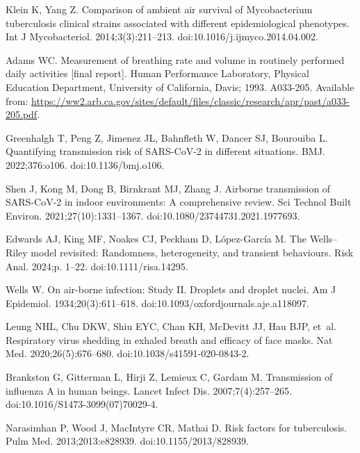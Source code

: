 \documentclass[fleqn,11pt]{wlscirep}
\begin{document}
\begin{thebibliography}{10}
Klein K, Yang Z.
\newblock Comparison of ambient air survival of {Mycobacterium} tuberculosis
  clinical strains associated with different epidemiological phenotypes.
\newblock Int J Mycobacteriol. 2014;3(3):211--213.
\newblock doi:10.1016/j.ijmyco.2014.04.002.

Adams WC.
\newblock Measurement of breathing rate and volume in routinely performed daily
  activities [final report].
\newblock Human Performance Laboratory, Physical Education Department,
  University of California, Davis; 1993. A033-205.
\newblock Available from:
  \url{https://ww2.arb.ca.gov/sites/default/files/classic/research/apr/past/a033-205.pdf}.

Greenhalgh T, Peng Z, Jimenez JL, Bahnfleth W, Dancer SJ, Bourouiba L.
\newblock Quantifying transmission risk of {SARS}-{CoV}-2 in different
  situations.
\newblock BMJ. 2022;376:o106.
\newblock doi:10.1136/bmj.o106.

Shen J, Kong M, Dong B, Birnkrant MJ, Zhang J.
\newblock Airborne transmission of {SARS}-{CoV}-2 in indoor environments: {A}
  comprehensive review.
\newblock Sci Technol Built Environ. 2021;27(10):1331--1367.
\newblock doi:10.1080/23744731.2021.1977693.

Edwards AJ, King MF, Noakes CJ, Peckham D, López-García M.
\newblock The {Wells}–{Riley} model revisited: {Randomness}, heterogeneity,
  and transient behaviours.
\newblock Risk Anal. 2024;p. 1--22.
\newblock doi:10.1111/risa.14295.

Wells W.
\newblock On air-borne infection: {Study} {II}. {Droplets} and droplet nuclei.
\newblock Am J Epidemiol. 1934;20(3):611--618.
\newblock doi:10.1093/oxfordjournals.aje.a118097.

Leung NHL, Chu DKW, Shiu EYC, Chan KH, McDevitt JJ, Hau BJP, et~al.
\newblock Respiratory virus shedding in exhaled breath and efficacy of face
  masks.
\newblock Nat Med. 2020;26(5):676--680.
\newblock doi:10.1038/s41591-020-0843-2.

Brankston G, Gitterman L, Hirji Z, Lemieux C, Gardam M.
\newblock Transmission of influenza {A} in human beings.
\newblock Lancet Infect Dis. 2007;7(4):257--265.
\newblock doi:10.1016/S1473-3099(07)70029-4.

Narasimhan P, Wood J, MacIntyre CR, Mathai D.
\newblock Risk factors for tuberculosis.
\newblock Pulm Med. 2013;2013:e828939.
\newblock doi:10.1155/2013/828939.


\end{thebibliography}
\end{document}
